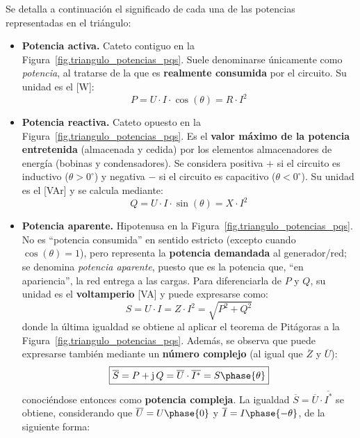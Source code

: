 	Se detalla a continuación el significado de cada una de las potencias representadas en el triángulo: 
	\begin{itemize}
		\item \textbf{Potencia activa.} Cateto contiguo en la Figura~\ref{fig.triangulo_potencias_pqs}. Suele denominarse únicamente como \textit{potencia}, al tratarse de la que es \textbf{realmente consumida} por el circuito. Su unidad es el [W]:
		\begin{equation}\label{eq.Pactiva}
			\boxed{P = U\cdot I\cdot\cos(\theta) = R \cdot I^2}
		\end{equation}
		\item \textbf{Potencia reactiva.} Cateto opuesto en la Figura~\ref{fig.triangulo_potencias_pqs}. Es el \textbf{valor máximo de la potencia entretenida} (almacenada y cedida) por los elementos almacenadores de energía (bobinas y condensadores). Se considera positiva $+$ si el circuito es inductivo ($\theta>0^\circ$) y negativa $-$ si el circuito es capacitivo ($\theta<0^\circ$). Su unidad es el [VAr] y se calcula mediante: 
		\begin{equation}\label{eq.Qreactiva}
			\boxed{Q = U\cdot I\cdot\sin(\theta) = X \cdot I^2}
		\end{equation}
		\item \textbf{Potencia aparente.} Hipotenusa en la Figura~\ref{fig.triangulo_potencias_pqs}. No es ``potencia consumida'' en sentido estricto (excepto cuando $\cos(\theta)=1$), pero representa la \textbf{potencia demandada} al generador/red; se denomina \textit{potencia aparente}, puesto que es la potencia que, ``en apariencia'', la red entrega a las cargas. Para diferenciarla de $P$ y $Q$, su unidad es el \textbf{voltamperio} [VA] y puede expresarse como: 
		\begin{equation}\label{eq.Saparente}
			\boxed{S = U\cdot I= Z \cdot I^2=\sqrt{P^2+Q^2}}
		\end{equation}
		donde la última igualdad se obtiene al aplicar el teorema de Pitágoras a la Figura~\ref{fig.triangulo_potencias_pqs}. Además, se observa que puede expresarse también mediante un \textbf{número complejo} (al igual que $\overline{Z}$ y $\overline{U}$): 
		\begin{equation}
			\boxed{\overline{S}=P+\mathrm{j}\,Q=\overline{U}\cdot \overline{I^*}=S\phase{\theta}}
		\end{equation}
		conociéndose entonces como \textbf{potencia compleja}. La igualdad $\overline{S}=\overline{U}\cdot \overline{I^*}$ se obtiene, considerando que $\overline{U} = U\phase{0}$ y $\overline{I} = I\phase{-\theta}$, de la siguiente forma: 

\end{itemize}
